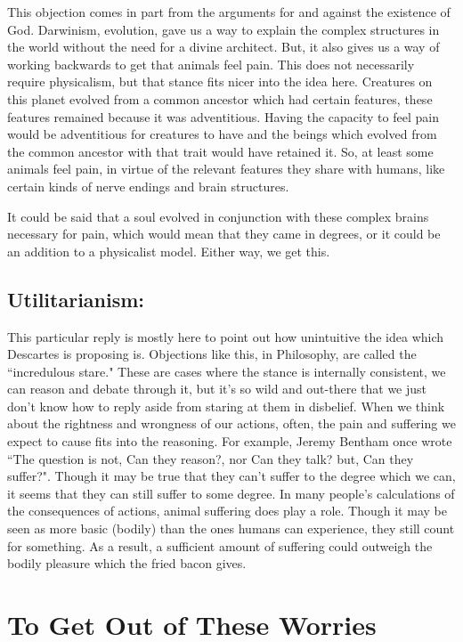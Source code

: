 This objection comes in part from the arguments for and against the existence of God. Darwinism, evolution, gave us a way to explain the complex structures in the world without the need for a divine architect. But, it also gives us a way of working backwards to get that animals feel pain.  This does not necessarily require physicalism, but that stance fits nicer into the idea here.  Creatures on this planet evolved from a common ancestor which had certain features, these features remained because it was adventitious. Having the capacity to feel pain would be adventitious for creatures to have and the beings which evolved from the common ancestor with that trait would have retained it. So, at least some animals feel pain, in virtue of the relevant features they share with humans, like certain kinds of nerve endings and brain structures.

It could be said that a soul evolved in conjunction with these complex brains necessary for pain, which would mean that they came in degrees, or it could be an addition to a physicalist model. Either way, we get this.
  
\subsection{Utilitarianism:}

This particular reply is mostly here to point out how unintuitive the idea which Descartes is proposing is. Objections like this, in Philosophy, are called the ``incredulous stare." These are cases where the stance is internally consistent, we can reason and debate through it, but it's so wild and out-there that we just don't know how to reply aside from staring at them in disbelief.  When we think about the rightness and wrongness of our actions, often, the pain and suffering we expect to cause fits into the reasoning. For example, Jeremy Bentham once wrote ``The question is not, Can they reason?, nor Can they talk? but, Can they suffer?".\autocite{Bentham1}  Though it may be true that they can't suffer to the degree which we can, it seems that they can still suffer to some degree. In many people’s calculations of the consequences of actions, animal suffering does play a role. Though it may be seen as more basic (bodily) than the ones humans can experience, they still count for something. As a result, a sufficient amount of suffering could outweigh the bodily pleasure which the fried bacon gives. 
\section{To Get Out of These Worries}

